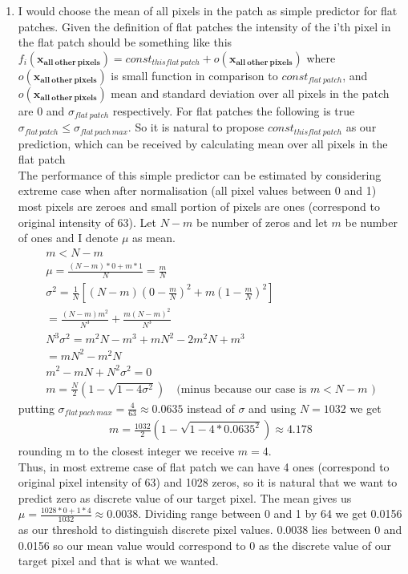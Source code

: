 \documentclass{article}
\newcommand{\vect}[1]{\boldsymbol{#1}} %
\begin{document}
\begin{enumerate}[label=(\alph*)]
				\item
					I would choose the mean of all pixels in the patch as simple predictor for flat patches. Given the definition of flat patches the intensity of the i'th pixel in the flat patch should be something like this $f_{i}(\vect{x_{all\ other\ pixels}}) = const_{this flat\ patch} + o(\vect{x_{all\ other\ pixels}})$ where $o(\vect{x_{all\ other\ pixels}})$ is small function in comparison to $const_{flat\ patch}$, and $o(\vect{x_{all\ other\ pixels}})$  mean and standard deviation over all pixels in the patch are 0 and $\sigma_{flat\ patch}$ respectively. For flat patches the following is true $\sigma_{flat \, patch} \leq \sigma_{flat \, pach \, max}$. So it is natural to propose  $const_{this flat\ patch}$ as our prediction, which can be received by calculating mean over all pixels in the flat patch\\
					The performance of this simple predictor can be estimated by considering extreme case when after normalisation (all pixel values between 0 and 1) most pixels are zeroes and small portion of pixels are ones (correspond to original intensity of 63). Let $N-m$ be number of zeros and let $m$ be number of ones and I denote $\mu$ as mean. 
					\begin{gather*}
						m < N - m
						\\
						\mu = \frac{(N - m) * 0 + m * 1}{N} = \frac{m}{N}
						\\
						\sigma^2 =\frac{1}{N}[(N - m) (0 - \frac{m}{N})^2 + m(1 - \frac{m}{N})^2]
						\\
						= \frac{(N - m)m^2}{N^3} + \frac{m(N - m)^2}{N ^ 3}
						\\
						N^3\sigma^2 = m^2N - m^3 + mN^2 - 2m^2N + m^3 
						\\
						= mN^2-m^2N
						\\
						m^2 - mN + N^2\sigma^2 = 0
						\\
						m = \frac{N}{2}(1 - \sqrt{1 - 4 \sigma ^ 2})\quad\text{(minus because our case is $m < N - m$ )}
					\end{gather*}
					putting $\sigma_{flat \, pach \, max} = \frac{4}{63} \approx 0.0635$ instead of $\sigma$ and using $N = 1032$ we get
					\begin{gather*}
						m = \frac{1032}{2}(1 - \sqrt{1 - 4 * 0.0635^2}) \approx 4.178
					\end{gather*}
					rounding m to the closest integer we receive $m = 4$. \\Thus, in most extreme case of flat patch we can have 4 ones (correspond to original pixel intensity of 63) and 1028 zeros, so it is natural that we want to predict zero as discrete value of our target pixel.  The mean gives us $\mu = \frac{1028 * 0 + 1 * 4} {1032} \approx 0.0038$. Dividing range between 0 and 1 by 64 we get 0.0156 as our threshold to distinguish discrete pixel values. 0.0038 lies between 0 and 0.0156 so our mean value would correspond to 0 as the discrete value of our target pixel and that is what we wanted.

\end{enumerate}
\end{document}

